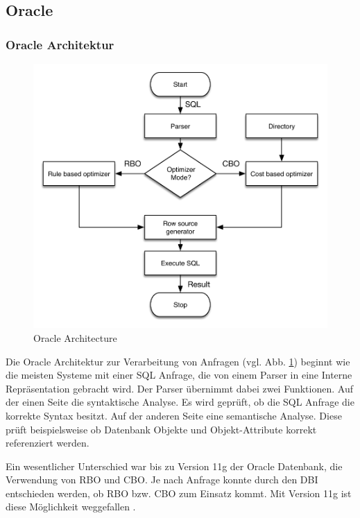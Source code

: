 \subsection{Oracle}
\subsubsection{Oracle Architektur}


\begin{figure}[ht]
  \centering
  \includegraphics[width=\textwidth]{02_Related_Work/Oracle.pdf}
  \caption{Oracle Architecture \cite{Oracle2004Basics}}
  \label{OracleArchitecture}
\end{figure}


Die Oracle Architektur zur Verarbeitung von Anfragen \cite{Oracle2004Basics}  (vgl. Abb. \ref{OracleArchitecture})  beginnt wie die meisten Systeme mit einer SQL Anfrage, die von einem Parser in eine Interne Repräsentation gebracht wird. Der Parser übernimmt dabei zwei Funktionen. Auf der einen Seite die syntaktische Analyse. Es wird geprüft, ob die SQL Anfrage die korrekte Syntax besitzt. Auf der anderen Seite eine semantische Analyse. Diese prüft beispielsweise ob Datenbank Objekte und Objekt-Attribute  korrekt referenziert werden. 

Ein wesentlicher Unterschied war bis zu Version 11g der Oracle Datenbank,  die Verwendung von \ac{RBO} und \ac{CBO}. Je nach Anfrage konnte durch den \ac{DBI} entschieden werden, ob \ac{RBO} bzw. \ac{CBO} zum Einsatz kommt. Mit Version 11g ist diese Möglichkeit weggefallen \cite{dba_oracle2015}. 

